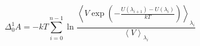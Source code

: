 


\[ \Delta_0^1 A = - kT \sum_{i=0}^{n-1} \ln \frac{\left< V \exp \left( -
    \frac{U(\lambda_{i+1}) - U(\lambda_i)}{kT} \right)
\right>_{\lambda_i}}{\left< V \right>_{\lambda_i}} \]


